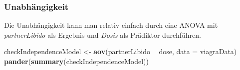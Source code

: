 \documentclass[]{article}
\newenvironment{Shaded}{\begin{snugshade}}{\end{snugshade}}
\newcommand{\DataTypeTok}[1]{\textcolor[rgb]{0.13,0.29,0.53}{#1}}
\newcommand{\KeywordTok}[1]{\textcolor[rgb]{0.13,0.29,0.53}{\textbf{#1}}}
\newcommand{\NormalTok}[1]{#1}
\newcommand{\OperatorTok}[1]{\textcolor[rgb]{0.81,0.36,0.00}{\textbf{#1}}}
\newcommand{\StringTok}[1]{\textcolor[rgb]{0.31,0.60,0.02}{#1}}
\begin{document}
\hypertarget{unabhangigkeit}{%
\subsubsection*{Unabhängigkeit}\label{unabhangigkeit}}

Die Unabhängigkeit kann man relativ einfach durch eine ANOVA mit \emph{partnerLibido} als Ergebnis und \emph{Dosis} als Prädiktor durchführen.

\begin{Shaded}
\begin{Highlighting}[]
\NormalTok{  checkIndependenceModel <-}\StringTok{ }\KeywordTok{aov}\NormalTok{(partnerLibido }\OperatorTok{~}\StringTok{ }\NormalTok{dose, }\DataTypeTok{data =}\NormalTok{ viagraData)}
  \KeywordTok{pander}\NormalTok{(}\KeywordTok{summary}\NormalTok{(checkIndependenceModel))}
\end{Highlighting}
\end{Shaded}
\end{document}
